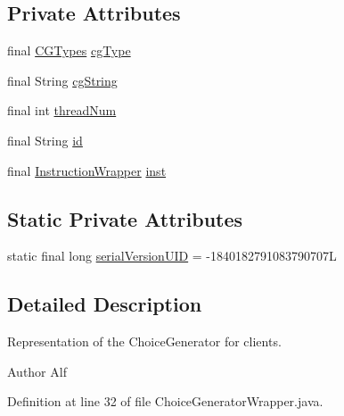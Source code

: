 \subsection*{Private Attributes}
\begin{DoxyCompactItemize}
\item 
final \hyperlink{enumgov_1_1nasa_1_1jpf_1_1inspector_1_1interfaces_1_1_choice_generators_interface_1_1_c_g_types}{C\+G\+Types} \hyperlink{classgov_1_1nasa_1_1jpf_1_1inspector_1_1utils_1_1_choice_generator_wrapper_aeb97dd901024e91ef0501b520a05bb11}{cg\+Type}
\item 
final String \hyperlink{classgov_1_1nasa_1_1jpf_1_1inspector_1_1utils_1_1_choice_generator_wrapper_a5f00af2fdb84e718d701dca82521b412}{cg\+String}
\item 
final int \hyperlink{classgov_1_1nasa_1_1jpf_1_1inspector_1_1utils_1_1_choice_generator_wrapper_a81cb8b377c3934a700c27d479e9a822a}{thread\+Num}
\item 
final String \hyperlink{classgov_1_1nasa_1_1jpf_1_1inspector_1_1utils_1_1_choice_generator_wrapper_a566b7a2497dd64278ba32f03a48dab33}{id}
\item 
final \hyperlink{classgov_1_1nasa_1_1jpf_1_1inspector_1_1utils_1_1_instruction_wrapper}{Instruction\+Wrapper} \hyperlink{classgov_1_1nasa_1_1jpf_1_1inspector_1_1utils_1_1_choice_generator_wrapper_adc999b17f238d7a35ca2832844d619f3}{inst}
\end{DoxyCompactItemize}
\subsection*{Static Private Attributes}
\begin{DoxyCompactItemize}
\item 
static final long \hyperlink{classgov_1_1nasa_1_1jpf_1_1inspector_1_1utils_1_1_choice_generator_wrapper_a74a23b94e17a7bd22f4d103fec7dc632}{serial\+Version\+U\+ID} = -\/1840182791083790707L
\end{DoxyCompactItemize}


\subsection{Detailed Description}
Representation of the Choice\+Generator for clients. 

\begin{DoxyAuthor}{Author}
Alf 
\end{DoxyAuthor}


Definition at line 32 of file Choice\+Generator\+Wrapper.\+java.



